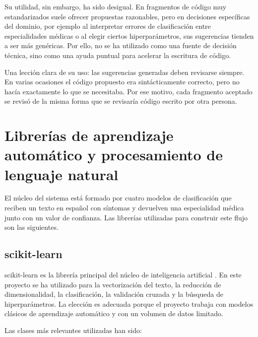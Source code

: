 Su utilidad, sin embargo, ha sido desigual. En fragmentos de código muy estandarizados suele ofrecer propuestas razonables, pero en decisiones específicas del dominio, por ejemplo al interpretar errores de clasificación entre especialidades médicas o al elegir ciertos hiperparámetros, sus sugerencias tienden a ser más genéricas. Por ello, no se ha utilizado como una fuente de decisión técnica, sino como una ayuda puntual para acelerar la escritura de código.

Una lección clara de su uso: las sugerencias generadas deben revisarse siempre. En varias ocasiones el código propuesto era sintácticamente correcto, pero no hacía exactamente lo que se necesitaba. Por ese motivo, cada fragmento aceptado se revisó de la misma forma que se revisaría código escrito por otra persona.

\section{Librerías de aprendizaje automático y procesamiento de lenguaje natural}

El núcleo del sistema está formado por cuatro modelos de clasificación que reciben un texto en español con síntomas y devuelven una especialidad médica junto con un valor de confianza. Las librerías utilizadas para construir este flujo son las siguientes.

\subsection{scikit-learn}

scikit-learn es la librería principal del núcleo de inteligencia artificial \cite{scikit_multiclass}. En este proyecto se ha utilizado para la vectorización del texto, la reducción de dimensionalidad, la clasificación, la validación cruzada y la búsqueda de hiperparámetros. La elección es adecuada porque el proyecto trabaja con modelos clásicos de aprendizaje automático y con un volumen de datos limitado.

Las clases más relevantes utilizadas han sido:

